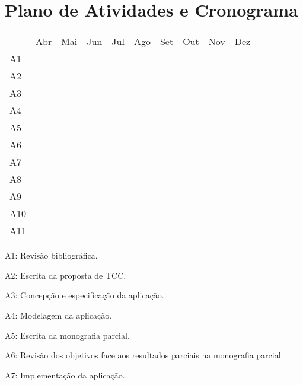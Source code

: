 \documentclass[tcc-proposta]{texufpel}
\begin{document}
\chapter{Plano de Atividades e Cronograma}

	\begin{table}[h!]
		\centering
		\label{my-label}
		\begin{tabular}{llllllllll}
		 & Abr & Mai & Jun & Jul & Ago & Set & Out & Nov & Dez \\
		A1 & \cellcolor[HTML]{9B9B9B} &  &  &  &  &  &  &  &  \\
		A2 &  & \cellcolor[HTML]{9B9B9B} & \cellcolor[HTML]{9B9B9B} &  &  &  &  &  &  \\
		A3 &  &  & \cellcolor[HTML]{9B9B9B} &  &  &  &  &  &  \\
		A4 &  &  & \cellcolor[HTML]{9B9B9B} & \cellcolor[HTML]{9B9B9B} &  &  &  &  &  \\
		A5 &  & \cellcolor[HTML]{9B9B9B} & \cellcolor[HTML]{9B9B9B} & \cellcolor[HTML]{9B9B9B} &  &  &  &  &  \\
    A6 &  &  &  & \cellcolor[HTML]{9B9B9B} &  &  &  &  &  \\
    A7 &  &  &  & \cellcolor[HTML]{9B9B9B} & \cellcolor[HTML]{9B9B9B} & \cellcolor[HTML]{9B9B9B} & \cellcolor[HTML]{9B9B9B} & \cellcolor[HTML]{9B9B9B} &  \\
		A8 &  &  &  &  &  &  &  & \cellcolor[HTML]{9B9B9B} & \cellcolor[HTML]{9B9B9B} \\
		A9 &  &  &  & \cellcolor[HTML]{9B9B9B} & \cellcolor[HTML]{9B9B9B} & \cellcolor[HTML]{9B9B9B} & \cellcolor[HTML]{9B9B9B} & \cellcolor[HTML]{9B9B9B} &  \\
		A10 &  &  &  &  &  &  &  & \cellcolor[HTML]{9B9B9B} &  \\
		A11 &  &  &  &  &  &  &  &  & \cellcolor[HTML]{9B9B9B}
		\end{tabular}
		\end{table}
	
	A1: Revisão bibliográfica.
	
	A2: Escrita da proposta de TCC.
	
	A3: Concepção e especificação da aplicação.
	
	A4: Modelagem da aplicação.
    
  	A5: Escrita da monografia parcial.
    
  	A6: Revisão dos objetivos face aos resultados parciais na monografia parcial.
	
	A7: Implementação da aplicação.
	
\end{document}
